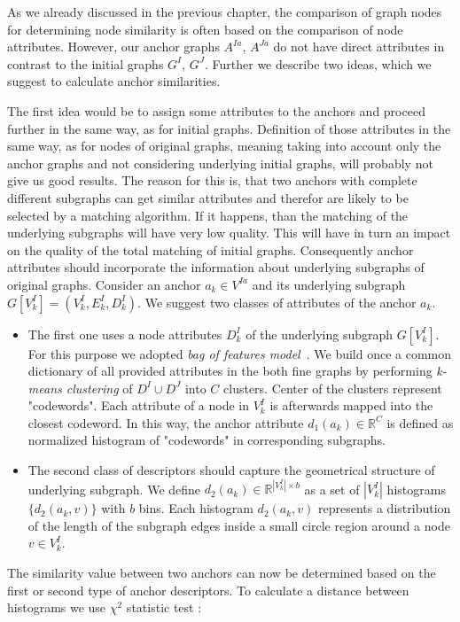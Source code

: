As we already discussed in the previous chapter, the comparison of graph nodes for determining node similarity is often based on the comparison of node attributes. However, our anchor graphs $A^{Ia}$, $A^{Ja}$ do not have direct attributes in contrast to the initial graphs $G^I$, $G^J$. Further we describe two ideas, which we suggest to calculate anchor similarities.

The first idea would be to assign some attributes to the anchors and proceed further in the same way, as for initial graphs. Definition of those attributes in the same way, as for nodes of original graphs, meaning taking into account only the anchor graphs and not considering underlying initial graphs, will probably not give us good results. The reason for this is, that two anchors with complete different subgraphs can get similar attributes and therefor are likely to be selected by a matching algorithm. If it happens, than the matching of the underlying subgraphs will have very low quality. This will have in turn an impact on the quality of the total matching of initial graphs. Consequently anchor attributes should incorporate the information about underlying subgraphs of original graphs.
Consider an anchor $a_k\in V^{Ia}$ and its underlying subgraph $G[V^I_k]=(V^I_k,E^I_k,D^I_k)$. We suggest two classes of attributes of the anchor $a_k$. 
\begin{itemize}
\item The first one uses a node attributes $D^I_k$ of the underlying subgraph $G[V^I_k]$. For this purpose we adopted \emph{bag of features model}~\cite{BoF_Leung2001}. We build once a common dictionary of all provided attributes in the both fine graphs by performing \emph{k-means clustering} of $D^I\cup D^J$ into $C$ clusters. Center of the clusters represent "codewords". Each attribute of a node in $V^I_k$ is afterwards mapped into the closest codeword. In this way, the anchor attribute $d_1(a_k)\in\mathbb{R}^C$ is defined as normalized histogram of "codewords" in corresponding subgraphs.

\item The second class of descriptors should capture the geometrical structure of underlying subgraph. We define $d_2(a_k)\in\mathbb{R}^{|V^I_k|\times b}$ as a set of $|V^I_k|$ histograms $\{d_2(a_k,v)\}$ with $b$ bins. Each histogram $d_2(a_k,v)$ represents a distribution of the length of the subgraph edges inside a small circle region around a node $v\in V^I_k$. 
\end{itemize}
The similarity value between two anchors can now be determined based on the first or second type of anchor descriptors. To calculate a distance between histograms we use $\chi^2$ statistic test \cite{Weken2004_ChiSqTest}:
